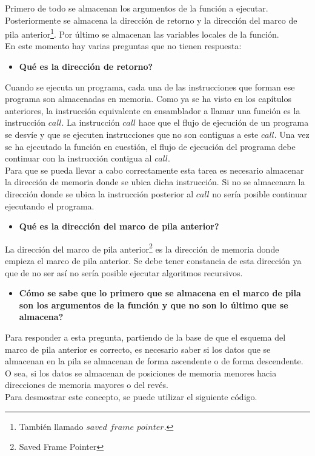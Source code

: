 \documentclass [titlepage, 12pt]{article}
\begin{document}
Primero de todo se almacenan los argumentos de la funci\'on a ejecutar. Posteriormente se almacena la direcci\'on de retorno y la direcci\'on del marco de pila anterior\footnote{Tambi\'en llamado $saved$ $frame$ $pointer$.}. Por \'ultimo se almacenan las variables locales de la funci\'on.\\
En este momento hay varias preguntas que no tienen respuesta: \bigskip

\begin{itemize}
	\item \textbf{Qu\'e es la direcci\'on de retorno?}
\end{itemize}

Cuando se ejecuta un programa, cada una de las instrucciones que forman ese programa son almacenadas en memoria. Como ya se ha visto en los cap\'itulos anteriores, la instrucci\'on equivalente en ensamblador a llamar una funci\'on es la instrucci\'on $call$. La instrucci\'on $call$ hace que el flujo de ejecuci\'on de un programa se desv\'ie y que se ejecuten instrucciones que no son contiguas a este $call$. Una vez se ha ejecutado la funci\'on en cuesti\'on, el flujo de ejecuci\'on del programa debe continuar con la instrucci\'on contigua al $call$.\\
Para que se pueda llevar a cabo correctamente esta tarea es necesario almacenar la direcci\'on de memoria donde se ubica dicha instrucci\'on. Si no se almacenara la direcci\'on donde se ubica la instrucci\'on posterior al $call$ no ser\'ia posible continuar ejecutando el programa.

\begin{itemize}
	\item \textbf{Qu\'e es la direcci\'on del marco de pila anterior?}
\end{itemize}

La direcci\'on del marco de pila anterior\footnote{Saved Frame Pointer} es la direcci\'on de memoria donde empieza el marco de pila anterior. Se debe tener constancia de esta direcci\'on ya que de no ser as\'i no ser\'ia posible ejecutar algoritmos recursivos.

\begin{itemize}
	\item \textbf{C\'omo se sabe que lo primero que se almacena en el marco de pila son los argumentos de la funci\'on y que no son lo \'ultimo que se almacena?}
\end{itemize}

Para responder a esta pregunta, partiendo de la base de que el esquema del marco de pila anterior es correcto, es necesario saber si los datos que se almacenan en la pila se almacenan de forma ascendente o de forma descendente. O sea, si los datos se almacenan de posiciones de memoria menores hacia direcciones de memoria mayores o del rev\'es.\\
Para desmostrar este concepto, se puede utilizar el siguiente c\'odigo. 
\end{document}
